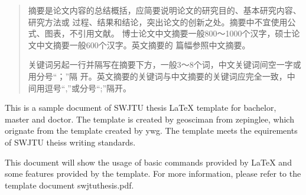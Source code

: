
\begin{abstract}
  摘要是论文内容的总结概括，应简要说明论文的研究目的、基本研究内容、 研究方法或
  过程、结果和结论，突出论文的创新之处。摘要中不宜使用公式、图表，不引用文献。
  博士论文中文摘要一般800～1000个汉字，硕士论文中文摘要一般600个汉字。英文摘要的
  篇幅参照中文摘要。

  关键词另起一行并隔写在摘要下方，一般3～8个词，中文关键词间空一字或用分号“；”隔
  开。英文摘要的关键词与中文摘要的关键词应完全一致，中间用逗号“,”或分号“;”隔开。

\end{abstract}

\begin{enabstract}
  This is a sample document of SWJTU thesis \LaTeX{} template for bachelor,
  master and doctor. The template is created by geosciman from zepinglee, which
  orignate from the template created by ywg. The template meets the
  equirements of SWJTU theiss writing standards.

  This document will show the usage of basic commands provided by \LaTeX{} and
  some features provided by the template. For more information, please refer to
  the template document swjtuthesis.pdf.

\end{enabstract}
